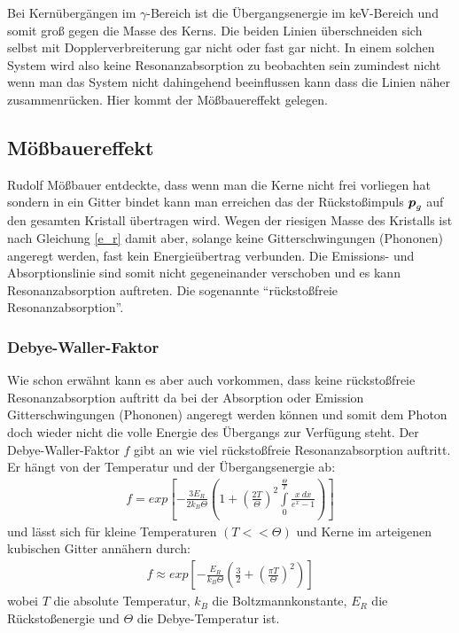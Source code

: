 \documentclass[12pt]{article}
\renewcommand*\vec[1]{{\mbox{\boldmath\ensuremath{#1}}}}
\begin{document}
Bei Kernübergängen im $\gamma$-Bereich ist die Übergangsenergie im keV-Bereich und somit groß gegen die Masse des Kerns. Die beiden Linien überschneiden sich
selbst mit Dopplerverbreiterung gar nicht oder fast gar nicht. In einem solchen System wird also keine Resonanzabsorption zu beobachten sein zumindest nicht
wenn man das System nicht dahingehend beeinflussen kann dass die Linien näher zusammenrücken. Hier kommt der Mößbauereffekt gelegen.

\subsection{Mößbauereffekt}
Rudolf Mößbauer entdeckte, dass wenn man die Kerne nicht frei vorliegen hat sondern in ein Gitter bindet kann man erreichen das der Rückstoßimpuls $\vec{p}_g$
auf den gesamten Kristall übertragen wird. Wegen der riesigen Masse des Kristalls ist nach Gleichung \ref{e_r} damit aber, solange keine Gitterschwingungen (Phononen) angeregt werden,
fast kein Energieübertrag verbunden. Die Emissions- und Absorptionslinie sind somit nicht gegeneinander verschoben und es kann Resonanzabsorption auftreten. Die sogenannte
``rückstoßfreie Resonanzabsorption''.

\subsubsection{Debye-Waller-Faktor}
Wie schon erwähnt kann es aber auch vorkommen, dass keine rückstoßfreie Resonanzabsorption auftritt da bei der Absorption oder Emission Gitterschwingungen (Phononen) 
angeregt werden können und somit dem Photon doch wieder nicht die volle Energie des Übergangs zur Verfügung steht. Der Debye-Waller-Faktor $f$ gibt an wie viel rückstoßfreie Resonanzabsorption
auftritt. Er hängt von der Temperatur und der Übergangsenergie ab:
\begin{align}
 f = exp\left[ -\frac{3E_R}{2k_B\Theta}\left(1+\left(\frac{2T}{\Theta}\right)^2 \int\limits_{0}^{\frac{\Theta}{T}} \frac{x~dx}{e^x - 1}\right)\right]
\end{align}
und lässt sich für kleine Temperaturen $(T<<\Theta)$ und Kerne im arteigenen kubischen Gitter annähern durch:
\begin{align}
 f \approx exp \left[ -\frac{E_R}{k_B\Theta}\left(\frac{3}{2} + \left(\frac{\pi T}{\Theta}\right)^2\right)\right]
\end{align}
wobei $T$ die absolute Temperatur, $k_B$ die Boltzmannkonstante, $E_R$ die Rückstoßenergie und $\Theta$ die Debye-Temperatur ist.
\end{document}
